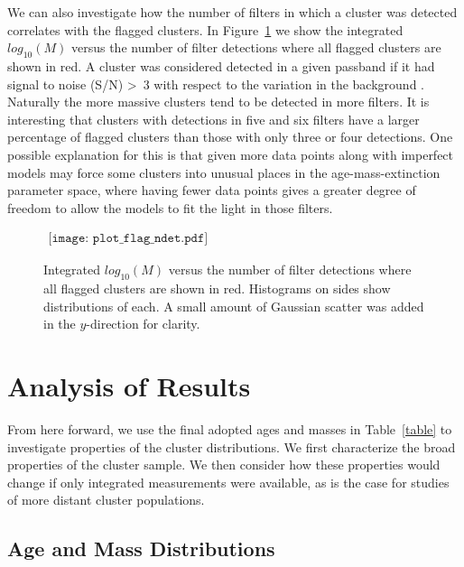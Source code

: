 \documentclass{emulateapj}
\begin{document}
We can also investigate how the number of filters in which a cluster was detected correlates with the flagged clusters.  In Figure~\ref{fig:ndet} we show the integrated $log_{10} (M)$ versus the number of filter detections where all flagged clusters are shown in red.  A cluster was considered detected in a given passband if it had signal to noise (S/N) \textgreater\ 3 with respect to the variation in the background \citep{Johnson15}.  Naturally the more massive clusters tend to be detected in more filters.  It is interesting that clusters with detections in five and six filters have a larger percentage of flagged clusters than those with only three or four detections.   One possible explanation for this is that given more data points along with imperfect models may force some clusters into unusual places in the age-mass-extinction parameter space, where having fewer data points gives a greater degree of freedom to allow the models to fit the light in those filters.


\begin{figure}[ht!]
   \begin{center}$
      \begin{array}{cc}
         \texttt{[image: plot\_flag\_ndet.pdf]} 
      \end{array}$
   \end{center}
  \caption{Integrated $log_{10} (M)$ versus the number of filter detections where all flagged clusters are shown in red.  Histograms on sides show distributions of each.  A small amount of Gaussian scatter was added in the $y$-direction for clarity.}
  \label{fig:ndet}
\end{figure}



\section{Analysis of Results}
From here forward, we use the final adopted ages and masses in Table~\ref{table} to investigate properties of the cluster distributions.  We first characterize the broad properties of the cluster sample.  We then consider how these properties would change if only integrated measurements were available, as is the case for studies of more distant cluster populations.


\subsection{Age and Mass Distributions}\label{sec:distributions}
\end{document}
